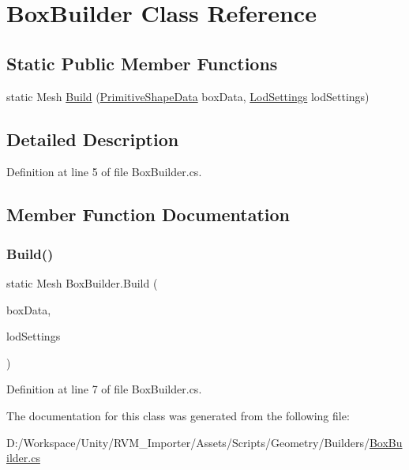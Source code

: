 \hypertarget{class_box_builder}{}\section{Box\+Builder Class Reference}
\label{class_box_builder}
\subsection*{Static Public Member Functions}
\begin{DoxyCompactItemize}
\item 
static Mesh \mbox{\hyperlink{class_box_builder_abc60d5703f823177fa84743c041866da}{Build}} (\mbox{\hyperlink{class_primitive_shape_data}{Primitive\+Shape\+Data}} box\+Data, \mbox{\hyperlink{class_lod_settings}{Lod\+Settings}} lod\+Settings)
\end{DoxyCompactItemize}


\subsection{Detailed Description}


Definition at line 5 of file Box\+Builder.\+cs.



\subsection{Member Function Documentation}
\mbox{\label{class_box_builder_abc60d5703f823177fa84743c041866da}} 
\subsubsection{\texorpdfstring{Build()}{Build()}}
{\footnotesize\ttfamily static Mesh Box\+Builder.\+Build (\begin{DoxyParamCaption}\item[{\mbox{\hyperlink{class_primitive_shape_data}{Primitive\+Shape\+Data}}}]{box\+Data,  }\item[{\mbox{\hyperlink{class_lod_settings}{Lod\+Settings}}}]{lod\+Settings }\end{DoxyParamCaption})\hspace{0.3cm}{\ttfamily [static]}}



Definition at line 7 of file Box\+Builder.\+cs.



The documentation for this class was generated from the following file\+:\begin{DoxyCompactItemize}
\item 
D\+:/\+Workspace/\+Unity/\+R\+V\+M\+\_\+\+Importer/\+Assets/\+Scripts/\+Geometry/\+Builders/\mbox{\hyperlink{_box_builder_8cs}{Box\+Builder.\+cs}}\end{DoxyCompactItemize}
